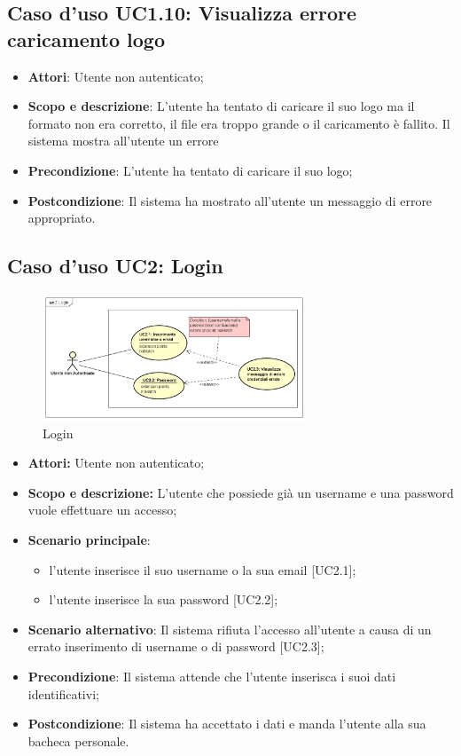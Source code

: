 \documentclass[12pt,a4paper,titlepage]{article}
\begin{document}
	\subsection{Caso d'uso UC1.10: Visualizza errore caricamento logo}
	\label{UC1.10}
	\begin{itemize}
		\item \textbf{Attori}: Utente non autenticato;
		\item \textbf{Scopo e descrizione}: L'utente ha tentato di caricare il suo logo ma il formato non era corretto, il file era troppo grande o il caricamento è fallito. Il sistema mostra all'utente un errore
		\item \textbf{Precondizione}: L'utente ha tentato di caricare il suo logo;
		\item \textbf{Postcondizione}: Il sistema ha mostrato all'utente un messaggio di errore appropriato.
	\end{itemize}
	\subsection{Caso d'uso UC2: Login}
	\label{UC2}
	\begin{figure}[H]
		\centering
		\includegraphics[width=0.7\textwidth]{UseCase/Login}
		\caption{Login}
	\end{figure}
	\begin{itemize}
		\item \textbf{Attori:} Utente non autenticato;
		\item \textbf{Scopo e descrizione:} L'utente che possiede già un username e una password vuole effettuare un accesso;
		\item \textbf{Scenario principale}:
		\begin{itemize}
			\item l'utente inserisce il suo username o la sua email [UC2.1];
			\item l'utente inserisce la sua password [UC2.2];
		\end{itemize}
		\item \textbf{Scenario alternativo}: Il sistema rifiuta l'accesso all'utente a causa di un errato inserimento di username o di password [UC2.3];
		\item \textbf{Precondizione}: Il sistema attende che l'utente inserisca i suoi dati identificativi;
		\item \textbf{Postcondizione}: Il sistema ha accettato i dati e manda l'utente alla sua bacheca personale.
	\end{itemize}
\end{document}
